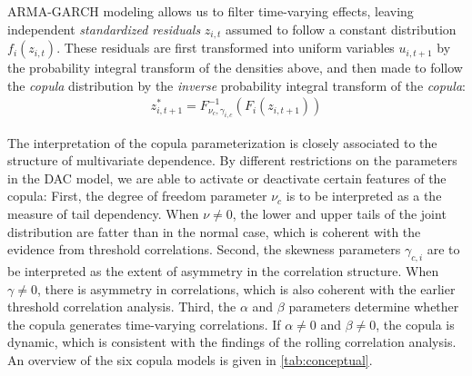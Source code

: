 ARMA-GARCH modeling allows us to filter time-varying effects, leaving independent \emph{standardized residuals} $z_{i,t}$ assumed to follow a constant distribution $f_i(z_{i,t})$. These residuals are first transformed into uniform variables $u_{i,t+1}$ by the probability integral transform of the densities above, and then made to follow the \emph{copula} distribution by the \emph{inverse} probability integral transform of the \emph{copula}:
\begin{align}
  z_{i,t+1}^* = F^{-1}_{\nu_c,\gamma_{i,c}}(F_{i}(z_{i,t+1}))
\end{align}

The interpretation of the copula parameterization is closely associated to the structure of multivariate dependence. By different restrictions on the parameters in the DAC model, we are able to activate or deactivate certain features of the copula: First, the degree of freedom parameter $\nu_c$ is to be interpreted as a the measure of tail dependency. When $\nu \neq 0$, the lower and upper tails of the joint distribution are fatter than in the normal case, which is coherent with the evidence from threshold correlations. Second, the skewness parameters $\gamma_{c,i}$ are to be interpreted as the extent of asymmetry in the correlation structure. When $\gamma \neq 0$, there is asymmetry in correlations, which is also coherent with the earlier threshold correlation analysis. Third, the $\alpha$ and $\beta$ parameters determine whether the copula generates time-varying correlations. If $\alpha \neq 0$ and $\beta \neq 0$, the copula is dynamic, which is consistent with the findings of the rolling correlation analysis. An overview of the six copula models is given in \autoref{tab:conceptual}.




